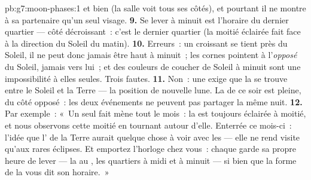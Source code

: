 \begin{solution}{pb:g7:moon-phases:1}
et bien (la salle voit tous ses côtés), et pourtant il ne montre à sa
partenaire qu'un seul visage.
\textbf{9.} Se lever à minuit est l'horaire du dernier quartier ---
côté décroissant~: c'est le dernier quartier (la moitié éclairée fait
face à la direction du Soleil du matin).
\textbf{10.} Erreurs~: un croissant se tient près du Soleil, il ne
peut donc jamais être haut à minuit~; les cornes pointent à
l'\emph{opposé} du Soleil, jamais vers lui~; et des couleurs de
coucher de Soleil à minuit sont une impossibilité à elles seules.
Trois fautes.
\textbf{11.} Non~: une  exige que la  se trouve
entre le Soleil et la Terre --- la position de nouvelle lune. La 
de ce soir est pleine, du côté opposé~: les deux événements ne
peuvent pas partager la même nuit.
\textbf{12.} Par exemple~: «~Un seul fait mène tout le mois~: la 
est toujours éclairée à moitié, et nous observons cette moitié en
tournant autour d'elle. Enterrée ce mois-ci~: l'idée que l' de la
Terre aurait quelque chose à voir avec les  --- elle ne rend
visite qu'aux rares éclipses. Et emportez l'horloge chez vous~: chaque
 garde sa propre heure de lever --- la  au , les quartiers à midi et à minuit --- si bien que la forme de
la  vous dit son horaire.~»
\end{solution}
